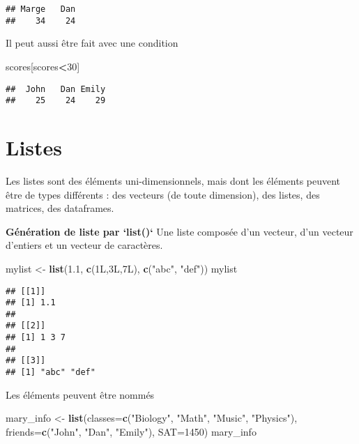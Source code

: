 \documentclass[]{book}
\newenvironment{Shaded}{\begin{snugshade}}{\end{snugshade}}
\newcommand{\DataTypeTok}[1]{\textcolor[rgb]{0.13,0.29,0.53}{#1}}
\newcommand{\DecValTok}[1]{\textcolor[rgb]{0.00,0.00,0.81}{#1}}
\newcommand{\FloatTok}[1]{\textcolor[rgb]{0.00,0.00,0.81}{#1}}
\newcommand{\KeywordTok}[1]{\textcolor[rgb]{0.13,0.29,0.53}{\textbf{#1}}}
\newcommand{\NormalTok}[1]{#1}
\newcommand{\OperatorTok}[1]{\textcolor[rgb]{0.81,0.36,0.00}{\textbf{#1}}}
\newcommand{\StringTok}[1]{\textcolor[rgb]{0.31,0.60,0.02}{#1}}
\begin{document}
\begin{verbatim}
## Marge   Dan 
##    34    24
\end{verbatim}

Il peut aussi être fait avec une condition

\begin{Shaded}
\begin{Highlighting}[]
\NormalTok{scores[scores}\OperatorTok{<}\DecValTok{30}\NormalTok{]}
\end{Highlighting}
\end{Shaded}

\begin{verbatim}
##  John   Dan Emily 
##    25    24    29
\end{verbatim}

\hypertarget{listes}{%
\section{Listes}\label{listes}}

Les listes sont des éléments uni-dimensionnels, mais dont les éléments peuvent être de types différents : des vecteurs (de toute dimension), des listes, des matrices, des dataframes.

\textbf{Génération de liste par `list()`}
Une liste composée d'un vecteur, d'un vecteur d'entiers et un vecteur de caractères.

\begin{Shaded}
\begin{Highlighting}[]
\NormalTok{mylist <-}\StringTok{ }\KeywordTok{list}\NormalTok{(}\FloatTok{1.1}\NormalTok{, }\KeywordTok{c}\NormalTok{(1L,3L,7L), }\KeywordTok{c}\NormalTok{(}\StringTok{"abc"}\NormalTok{, }\StringTok{"def"}\NormalTok{))}
\NormalTok{mylist}
\end{Highlighting}
\end{Shaded}

\begin{verbatim}
## [[1]]
## [1] 1.1
## 
## [[2]]
## [1] 1 3 7
## 
## [[3]]
## [1] "abc" "def"
\end{verbatim}

Les éléments peuvent être nommés

\begin{Shaded}
\begin{Highlighting}[]
\NormalTok{mary_info <-}\StringTok{ }\KeywordTok{list}\NormalTok{(}\DataTypeTok{classes=}\KeywordTok{c}\NormalTok{(}\StringTok{"Biology"}\NormalTok{, }\StringTok{"Math"}\NormalTok{, }\StringTok{"Music"}\NormalTok{,}
                            \StringTok{"Physics"}\NormalTok{),}
                  \DataTypeTok{friends=}\KeywordTok{c}\NormalTok{(}\StringTok{"John"}\NormalTok{, }\StringTok{"Dan"}\NormalTok{, }\StringTok{"Emily"}\NormalTok{),}
                  \DataTypeTok{SAT=}\DecValTok{1450}\NormalTok{)}
\NormalTok{mary_info}
\end{Highlighting}
\end{Shaded}
\end{document}
